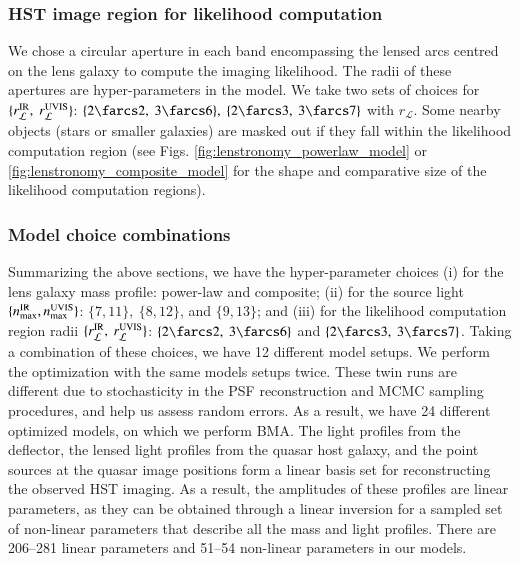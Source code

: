 \documentclass[longauth]{aa}
\newcommand{\ajs}[1]{{{#1}}}
\newcommand{\lreply}[1]{{{#1}}}
\begin{document}
\subsubsection{HST image region for likelihood computation} \label{sec:lenstronomy_mask_settings}

We chose a circular aperture in each band encompassing the lensed arcs centred on the lens galaxy to compute the imaging likelihood. The radii of these apertures are hyper-parameters in the model. We take two sets of choices for $\{r_{\mathcal{L}}^{\rm IR},\ r_{\mathcal{L}}^{\rm UVIS} \}$: $\{ 2\farcs2,\ 3\farcs6 \},\ \{ 2\farcs3,\ 3\farcs7 \}$ with $r_{\mathcal{L}}$. Some nearby objects (stars or smaller galaxies) are masked out if they fall within the likelihood computation region (see Figs. \ref{fig:lenstronomy_powerlaw_model} or \ref{fig:lenstronomy_composite_model} for the shape and comparative size of the likelihood computation regions).

\subsubsection{Model choice combinations} \label{sec:lenstronomy_settings_combination}

Summarizing the above sections, we have the hyper-parameter choices \lreply{(i) for the lens galaxy mass profile: power-law and composite; (ii) for the source light $\{n_{\rm max}^{\rm IR}, n_{\rm max}^{\rm UVIS} \}$: $\{7, 11\},\ \{8, 12\}$, and $\{9, 13\}$; and (iii) for the likelihood computation region radii $\{r_{\mathcal{L}}^{\rm IR},\  r_{\mathcal{L}}^{\rm UVIS} \}$: $\{ 2\farcs2,\ 3\farcs6 \}$ and $\{ 2\farcs3,\ 3\farcs7 \}$}.
%
%
Taking a combination of these choices, we have 12 different model setups. We perform the optimization with the same models setups twice. These twin runs are different due to stochasticity in the PSF reconstruction and MCMC sampling procedures, and help us assess random errors. As a result, we have 24 different optimized models, on which we perform BMA. \ajs{The light profiles from the deflector, the lensed light profiles from the quasar host galaxy, and the point sources at the quasar image positions form a linear basis set for reconstructing the observed HST imaging. As a result, the amplitudes of these profiles are linear parameters, as they can be obtained through a linear inversion for a sampled set of non-linear parameters that describe all the mass and light profiles.} There are 206--281 linear parameters and 51--54 non-linear parameters in our models.
\end{document}
